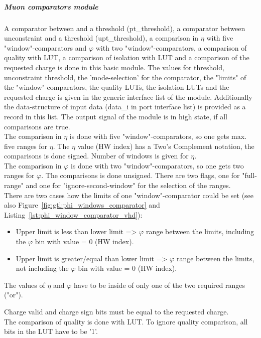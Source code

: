 \subparagraph{Muon comparators module}\label{sec:gtl:muon_comp_module}
A comparator between \pt and a threshold (pt\_threshold), a comparator between unconstraint \pt and a threshold (upt\_threshold), a comparison in $\eta$ with five "window"-comparators and $\varphi$ with two "window"-comparators, a comparison of quality with LUT, a comparison of isolation with LUT and a comparison of the requested charge is done in this basic module. The values for \pt threshold, unconstraint \pt threshold, the 'mode-selection' for the \pt comparator, the "limits" of the "window"-comparators, the quality LUTs, the isolation LUTs and the requested charge is given in the generic interface list of the module.
Additionally the data-structure of input data (data\_i in port interface list) is provided as a record in this list. The output signal of the module is in high state, if all comparisons are true.\\
The comparison in $\eta$ is done with five "window"-comparators, so one gets max. five ranges for $\eta$. The $\eta$ value (HW index) has a Two's Complement notation, the comparisons is done signed. Number of windows is given for $\eta$.\\
The comparison in $\varphi$ is done with two "window"-comparators, so one gets two ranges for $\varphi$. The comparisons is done unsigned. There are two flags, one for "full-range" and one for "ignore-second-window" for the selection of the ranges.\\
There are two cases how the limits of one "window"-comparator could be set (see also Figure~\ref{fig:gtl:phi_windows_comparator} and Listing~\ref{lst:phi_window_comparator_vhd}):
\begin{itemize}
\item Upper limit is less than lower limit => $\varphi$ range between the limits, including the $\varphi$ bin with value = 0 (HW index).
\item Upper limit is greater/equal than lower limit => $\varphi$ range between the limits, not including the $\varphi$ bin with value = 0 (HW index).
\end{itemize}

The values of $\eta$ and $\varphi$ have to be inside of only one of the two required ranges ("or").

Charge valid and charge sign bits must be equal to the requested charge.\\
The comparison of quality is done with LUT. To ignore quality comparison, all bits in the LUT have to be '1'.\\


